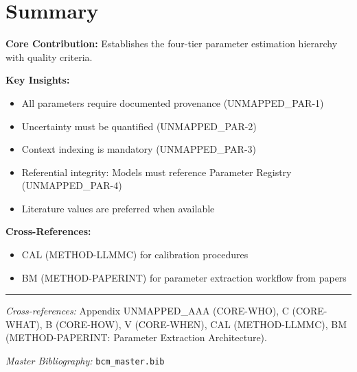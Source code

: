\section{Summary}

\begin{tcolorbox}[colback=gray!5!white, colframe=gray!75!black,
    title=Appendix UNMAPPED_BBB Summary: CORE-WHERE]

\textbf{Core Contribution:}
Establishes the four-tier parameter estimation hierarchy with quality criteria.

\textbf{Key Insights:}
\begin{itemize}[nosep]
\item All parameters require documented provenance (UNMAPPED_PAR-1)
\item Uncertainty must be quantified (UNMAPPED_PAR-2)
\item Context indexing is mandatory (UNMAPPED_PAR-3)
\item Referential integrity: Models must reference Parameter Registry (UNMAPPED_PAR-4)
\item Literature values are preferred when available
\end{itemize}

\textbf{Cross-References:}
\begin{itemize}[nosep]
\item CAL (METHOD-LLMMC) for calibration procedures
\item BM (METHOD-PAPERINT) for parameter extraction workflow from papers
\end{itemize}

\end{tcolorbox}

\vspace{1em}
\hrule
\vspace{0.5em}

\noindent\textit{Cross-references:}
Appendix UNMAPPED_AAA (CORE-WHO), C (CORE-WHAT), B (CORE-HOW), V (CORE-WHEN),
CAL (METHOD-LLMMC), BM (METHOD-PAPERINT: Parameter Extraction Architecture).

\noindent\textit{Master Bibliography:} \texttt{bcm\_master.bib}

\nocite{bcm_master}

